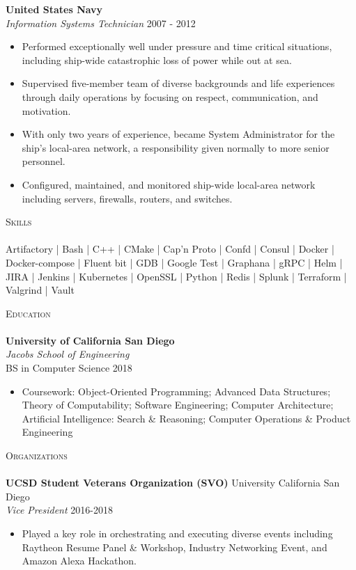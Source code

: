 \documentclass[a4paper]{article}
\newcommand{\lineunder} {
    \vspace*{-8pt} \\
    \hspace*{-18pt} \hrulefill \\
}
\newcommand{\header} [1] {
    {\hspace*{-18pt}\vspace*{6pt} \textsc{#1}}
    \vspace*{-6pt} \lineunder
}
\begin{document}
\textbf{United States Navy} \hfill \\
\textit{Information Systems Technician} \hfill 2007 - 2012\\
\vspace{-1mm}
\begin{itemize} \itemsep 1pt
	\item Performed exceptionally well under pressure and time critical situations, including ship-wide catastrophic loss of power while out at sea.
	\item Supervised five-member team of diverse backgrounds and life experiences through daily operations by focusing on respect, communication, and motivation.
	\item With only two years of experience, became System Administrator for the ship’s local-area network, a responsibility given normally to more senior personnel.
	\item Configured, maintained, and monitored ship-wide local-area network including servers, firewalls, routers, and switches.
\end{itemize}

\header{Skills}
Artifactory | Bash | C++ | CMake | Cap'n Proto | Confd | Consul | Docker | Docker-compose | Fluent bit | GDB | Google Test | Graphana | gRPC | Helm | JIRA | Jenkins | Kubernetes | OpenSSL | Python | Redis | Splunk | Terraform | Valgrind | Vault
\\
\vspace{2mm}

\header{Education}
\textbf{University of California San Diego}\hfill \\
\textit{Jacobs School of Engineering} \\
BS in Computer Science \hfill 2018\\
\begin{itemize} \itemsep 1pt
	\item Coursework: Object-Oriented Programming; Advanced Data Structures; Theory of Computability; Software Engineering; Computer Architecture; Artificial Intelligence: Search \& Reasoning; Computer Operations \& Product Engineering \\
\end{itemize}

\vspace{2mm}

\header{Organizations}
\textbf{UCSD Student Veterans Organization (SVO)} \hfill University California San Diego\\
\textit{Vice President} \hfill 2016-2018\\
\vspace{-1mm}
\begin{itemize} \itemsep 1pt
	\item Played a key role in orchestrating and executing diverse events including Raytheon Resume Panel \& Workshop, Industry Networking Event, and Amazon Alexa Hackathon.
\end{itemize}

\vspace*{2mm}

\
\end{document}
